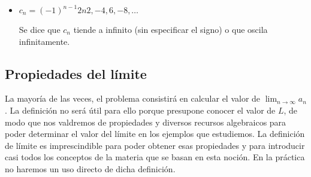 \documentclass[../teoria.root.tex]{subfiles}
\begin{document}
\begin{itemize}
\begin{center}
\begin{scaletikzpicturetowidth}{.5\linewidth}
              \end{scaletikzpicturetowidth}
          \end{center}
          \[\lim_{n\to\infty}b_n\,\text{no existe}\] En este caso se dice que \(a_n\) oscila finitamente.
    \item \(c_n=(-1)^{n-1}2n\)\tab\(2,-4,6,-8,\dots\)
          \begin{center}
              \begin{scaletikzpicturetowidth}{.5\linewidth}
              \end{scaletikzpicturetowidth}
          \end{center}
          Se dice que \(c_n\) tiende a infinito (sin especificar el signo) o que oscila infinitamente.
\end{itemize}
\subsection{Propiedades del límite}
La mayoría de las veces, el problema consistirá en calcular el valor de \(\lim_{n\to\infty}a_n\).
La definición no será útil para ello porque presupone conocer el valor de \(L\), de modo que nos valdremos de propiedades y diversos recursos algebraicos para poder determinar el valor del límite en los ejemplos que estudiemos.
La definición de límite es imprescindible para poder obtener esas propiedades y para introducir casi todos los conceptos de la materia que se basan en esta noción.
En la práctica no haremos un uso directo de dicha definición.
\end{document}
